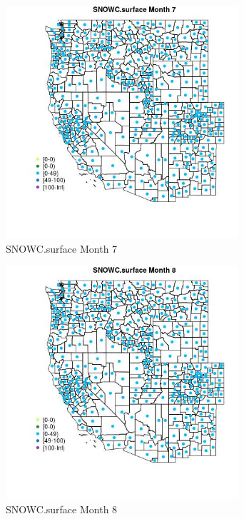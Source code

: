\begin{figure} 
\centering  
\includegraphics[width=0.77\textwidth]{Code_Outputs/df_report_ML_predictors_CountyCentroid_Locations_Dates_2008-01-01to2018-12-31_MapObsMo7SNOWCsurface.jpg} 
\caption{\label{fig:df_report_ML_predictors_CountyCentroid_Locations_Dates_2008-01-01to2018-12-31MapObsMo7SNOWCsurface}SNOWC.surface Month 7} 
\end{figure} 
 

\begin{figure} 
\centering  
\includegraphics[width=0.77\textwidth]{Code_Outputs/df_report_ML_predictors_CountyCentroid_Locations_Dates_2008-01-01to2018-12-31_MapObsMo8SNOWCsurface.jpg} 
\caption{\label{fig:df_report_ML_predictors_CountyCentroid_Locations_Dates_2008-01-01to2018-12-31MapObsMo8SNOWCsurface}SNOWC.surface Month 8} 
\end{figure} 
 

